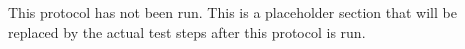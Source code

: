 This protocol has not been run.  This is a placeholder section that will be
replaced by the actual test steps after this protocol is run.